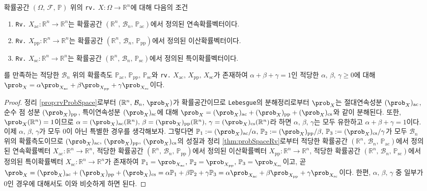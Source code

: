 \begin{theorem}
    확률공간 $(\Omega,\,\mathcal{F},\,\mathbb{P})$ 위의 \texttt{rv.} $X:\Omega\to\mathbb{R}^n$에 대해 다음의 조건
    \begin{enumerate}
        \item \texttt{Rv.} $X_\mathrm{ac}:\mathbb{R}^n\to\mathbb{R}^n$는 확률공간 $(\mathbb{R}^n,\,\mathcal{B}_n,\,\mathbb{P}_\mathrm{ac})$에서 정의된 연속확률벡터이다.
        \item \texttt{Rv.} $X_\mathrm{pp}:\mathbb{R}^n\to\mathbb{R}^n$는 확률공간 $(\mathbb{R}^n,\,\mathcal{B}_n,\,\mathbb{P}_\mathrm{pp})$에서 정의된 이산확률벡터이다.
        \item \texttt{Rv.} $X_\mathrm{sc}:\mathbb{R}^n\to\mathbb{R}^n$는 확률공간 $(\mathbb{R}^n,\,\mathcal{B}_n,\,\mathbb{P}_\mathrm{sc})$에서 정의된 특이확률벡터이다.
    \end{enumerate}
    를 만족하는 적당한 $\mathcal{B}_n$ 위의 확률측도 $\mathbb{P}_\mathrm{ac},\,\mathbb{P}_\mathrm{pp},\,\mathbb{P}_\mathrm{sc}$와 \texttt{rv.} $X_\mathrm{ac},\,X_\mathrm{pp},\,X_\mathrm{sc}$가 존재하여 $\alpha+\beta+\gamma=1$인 적당한 $\alpha,\,\beta,\,\gamma\geq0$에 대해 $\prob_X=\alpha\prob_{X_\mathrm{ac}}+\beta\prob_{X_\mathrm{pp}}+\gamma\prob_{X_\mathrm{sc}}$이다.
\end{theorem}

\begin{proof}
    정리 \ref{prop:rvProbSpace}로부터 $(\mathbb{R}^n,\,\mathcal{B}_n,\,\prob_X)$가 확률공간이므로 \texttt{Lebesgue}의 분해정리로부터 $\prob_X$는 절대연속성분 $(\prob_X)_\mathrm{ac}$, 순수 점 성분 $(\prob_X)_\mathrm{pp}$, 특이연속성분 $(\prob_X)_\mathrm{sc}$에 대해 $\prob_X=(\prob_X)_\mathrm{ac}+(\prob_X)_\mathrm{pp}+(\prob_X)_\mathrm{cs}$와 같이 분해된다. 또한, $\prob_X(\mathbb{R}^n)=1$이므로 $\alpha=(\prob_X)_\mathrm{ac}(\mathbb{R}^n),\,\beta=(\prob_X)_\mathrm{pp}(\mathbb{R}^n),\,\gamma=(\prob_X)_\mathrm{cs}(\mathbb{R}^n)$라 하면 $\alpha,\,\beta,\,\gamma$는 모두 유한하고 $\alpha+\beta+\gamma=1$이다. 이제 $\alpha,\,\beta,\,\gamma$가 모두 $0$이 아닌 특별한 경우를 생각해보자. 그렇다면 $\mathbb{P}_1:=(\prob_X)_\mathrm{ac}/\alpha,\,\mathbb{P}_2:=(\prob_X)_\mathrm{pp}/\beta,\,\mathbb{P}_3:=(\prob_X)_\mathrm{cs}/\gamma$가 모두 $\mathcal{B}_n$ 위의 확률측도이므로 $(\prob_X)_\mathrm{ac},\,(\prob_X)_\mathrm{pp},\,(\prob_X)_\mathrm{cs}$의 성질과 정리 \ref{thm:probSpaceRv}로부터 적당한 확률공간 $(\mathbb{R}^n,\,\mathcal{B}_n,\,\mathbb{P}_\mathrm{ac})$에서 정의된 연속확률벡터 $X_\mathrm{ac}:\mathbb{R}^n\to\mathbb{R}^n$, 적당한 확률공간 $(\mathbb{R}^n,\,\mathcal{B}_n,\,\mathbb{P}_\mathrm{pp})$에서 정의된 이산확률벡터 $X_\mathrm{pp}:\mathbb{R}^n\to\mathbb{R}^n$, 적당한 확률공간 $(\mathbb{R}^n,\,\mathcal{B}_n,\,\mathbb{P}_\mathrm{sc})$에서 정의된 특이확률벡터 $X_\mathrm{sc}:\mathbb{R}^n\to\mathbb{R}^n$가 존재하여 $\mathbb{P}_1=\prob_{X_\mathrm{ac}},\,\mathbb{P}_2=\prob_{X_\mathrm{pp}},\,\mathbb{P}_3=\prob_{X_\mathrm{sc}}$이고, 곧 $\prob_X=(\prob_X)_\mathrm{ac}+(\prob_X)_\mathrm{pp}+(\prob_X)_\mathrm{cs}=\alpha\mathbb{P}_1+\beta\mathbb{P}_2+\gamma\mathbb{P}_3=\alpha\prob_{X_\mathrm{ac}}+\beta\prob_{X_\mathrm{pp}}+\gamma\prob_{X_\mathrm{sc}}$이다. 한편, $\alpha,\,\beta,\,\gamma$ 중 일부가 $0$인 경우에 대해서도 이와 비슷하게 하면 된다.
\end{proof}

